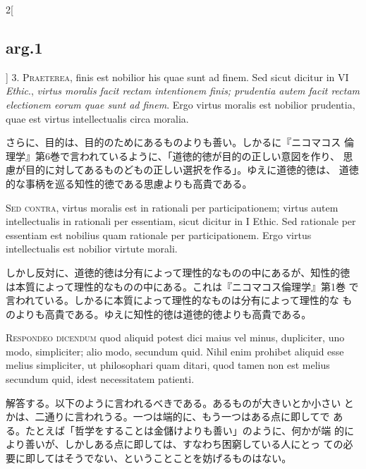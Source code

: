 \documentclass[paper=a4paper,fontsize=10pt,jafontsize=9pt,titlepage]{jlreq}
\begin{document}
\begin{paracol}{2}[\subsection{arg.1}]
3. {\scshape Praeterea}, finis est nobilior his quae sunt ad
finem. Sed sicut dicitur in VI {\itshape Ethic}., {\itshape virtus
moralis facit rectam intentionem finis; prudentia autem facit rectam
electionem eorum quae sunt ad finem}. Ergo virtus moralis est nobilior
prudentia, quae est virtus intellectualis circa moralia.

\switchcolumn

さらに、目的は、目的のためにあるものよりも善い。しかるに『ニコマコス
 倫理学』第6巻で言われているように、「道徳的徳が目的の正しい意図を作り、
 思慮が目的に対してあるものどもの正しい選択を作る」。ゆえに道徳的徳は、
 道徳的な事柄を巡る知性的徳である思慮よりも高貴である。

\switchcolumn*[\subsection{s.c.}]

{\scshape Sed contra}, virtus moralis est in rationali per
participationem; virtus autem intellectualis in rationali per
essentiam, sicut dicitur in I Ethic. Sed rationale per essentiam est
nobilius quam rationale per participationem. Ergo virtus
intellectualis est nobilior virtute morali.

\switchcolumn

しかし反対に、道徳的徳は分有によって理性的なものの中にあるが、知性的徳
は本質によって理性的なものの中にある。これは『ニコマコス倫理学』第1巻
で言われている。しかるに本質によって理性的なものは分有によって理性的な
ものよりも高貴である。ゆえに知性的徳は道徳的徳よりも高貴である。


{\scshape Respondeo dicendum} quod aliquid potest dici maius vel
minus, dupliciter, uno modo, simpliciter; alio modo, secundum
quid. Nihil enim prohibet aliquid esse melius simpliciter, ut
philosophari quam ditari, quod tamen non est melius secundum quid,
idest necessitatem patienti.

\switchcolumn

解答する。以下のように言われるべきである。あるものが大きいとか小さい
 とかは、二通りに言われうる。一つは端的に、もう一つはある点に即してで
 ある。たとえば「哲学をすることは金儲けよりも善い」のように、何かが端
 的により善いが、しかしある点に即しては、すなわち困窮している人にとっ
 ての必要に即してはそうでない、ということことを妨げるものはない。


\end{paracol}
\end{document}
